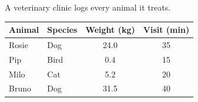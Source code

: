 \documentclass[12pt]{article}
\begin{document}

\vspace{0.24in}

\boxguard[16]
\begin{hookbox}
A veterinary clinic logs every animal it treats.

\vspace{8pt}
\begin{center}
\renewcommand{\arraystretch}{1.4}
\begin{tabular}{@{} l l c c @{}}
\rowcolor{sky}
\textbf{Animal} & \textbf{Species} & \textbf{Weight (kg)} & \textbf{Visit (min)} \\
\hline
Rosie & Dog  & 24.0 & 35 \\
Pip   & Bird &  0.4 & 15 \\
Milo  & Cat  &  5.2 & 20 \\
Bruno & Dog  & 31.5 & 40 \\
\hline
\end{tabular}
\end{center}
\vspace{4pt}
\end{hookbox}

\vspace{0.26in}
\end{document}
